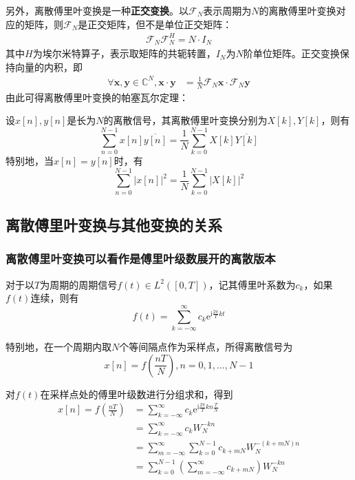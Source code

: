 另外，离散傅里叶变换是一种\textbf{正交变换}。以$\mathcal{F} _N$表示周期为$N$的离散傅里叶变换对应的矩阵，则$\mathcal{F} _N$是正交矩阵，但不是单位正交矩阵：
\begin{align*}
\mathcal{F}_N \mathcal{F}_N^H = N\cdot I_N
\end{align*}
其中$H$为埃尔米特算子，表示取矩阵的共轭转置，$I_N$为$N$阶单位矩阵。正交变换保持向量的内积，即
\begin{align*}
    \forall \mathbf{x,y}\in\mathbb{C}^N,\mathbf{x}\cdot\mathbf{y}&=\frac{1}{N}\mathcal{F} _N \mathbf{x}\cdot\mathcal{F} _N \mathbf{y}
\end{align*}
由此可得离散傅里叶变换的帕塞瓦尔定理：
\begin{theorem}[离散傅里叶变换的帕塞瓦尔定理]
    设$x[n],y[n]$是长为$N$的离散信号，其离散傅里叶变换分别为$X[k],Y[k]$，则有
    \[\sum_{n=0}^{N-1}x[n]\overline{y[n]}=\frac{1}{N}\sum_{k=0}^{N-1}X[k]\overline{Y[k]}\]
    特别地，当$x[n]=y[n]$时，有
    \[\sum_{n=0}^{N-1}|x[n]|^2=\frac{1}{N}\sum_{k=0}^{N-1}|X[k]|^2\]
\end{theorem}

\subsection{离散傅里叶变换与其他变换的关系}\label{sub:relation_of_dft}

\subsubsection{离散傅里叶变换可以看作是傅里叶级数展开的离散版本}

对于以$T$为周期的周期信号$f(t)\in L^2([0,T])$，记其傅里叶系数为$c_k$，如果$f(t)$连续，则有
\[f(t)=\sum_{k=-\infty}^{\infty}c_k \mathrm{e}^{\mathrm{i}\frac{2\pi}{T}kt}\]

特别地，在一个周期内取$N$个等间隔点作为采样点，所得离散信号为
\[x[n]=f\left(\frac{nT}{N}\right),n=0,1,\dots,N-1\]

对$f(t)$在采样点处的傅里叶级数进行分组求和，得到
\begin{align*}
    x[n]=f\left(\frac{nT}{N}\right)&=\sum_{k=-\infty}^{\infty}c_k \mathrm{e}^{\mathrm{i}\frac{2\pi}{T}kn\frac{T}{N}}\\
    &=\sum_{k=-\infty}^{\infty}c_k W_N^{-kn}\\
    &=\sum_{m=-\infty}^{\infty}\sum_{k=0}^{N-1}c_{k+mN} W_N^{-(k+mN)n}\\
    &=\sum_{k=0}^{N-1}\left(\sum_{m=-\infty}^{\infty}c_{k+mN}\right)W_N^{-kn}
\end{align*}

